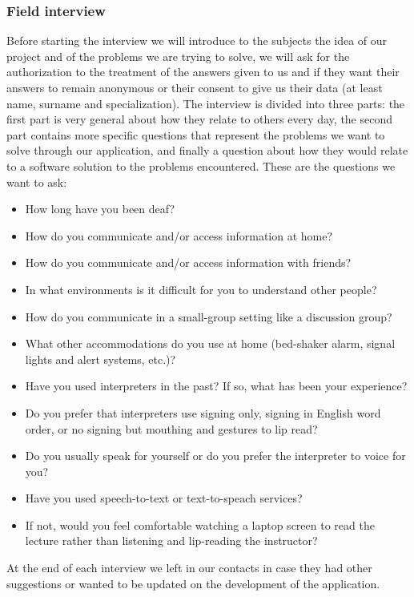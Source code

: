 \subsubsection{Field interview}
Before starting the interview we will introduce to the subjects the idea of our project and of the problems we are trying to solve, we will ask for the authorization to the treatment of the answers given to us and if they want their answers to remain anonymous or their consent to give us their data (at least name, surname and specialization). The interview is divided into three parts: the first part is very general about how they relate to others every day, the second part contains more specific questions that represent the problems we want to solve through our application, and finally a question about how they would relate to a software solution to the problems encountered. These are the questions we want to ask: 
\begin{itemize}
	\item How long have you been deaf?
	\item How do you communicate and/or access information at home?
	\item How do you communicate and/or access information with friends?
	\item In what environments is it difficult for you to understand other people?
	\item How do you communicate in a small-group setting like a discussion group?
	
	\item What other accommodations do you use at home (bed-shaker alarm, signal lights and alert
	systems, etc.)?
	\item Have you used interpreters in the past? If so, what has been your experience?
	\item Do you prefer that interpreters use signing only, signing in English word order, or no signing
	but mouthing and gestures to lip read?
	\item Do you usually speak for yourself or do you prefer the interpreter to voice for you?
	
	\item Have you used speech-to-text or text-to-speach services?
	\item If not, would you feel comfortable watching a laptop screen to read the lecture rather than
	listening and lip-reading the instructor?
\end{itemize}

At the end of each interview we left in our contacts in case they had other suggestions or wanted to be updated on the development of the application.

